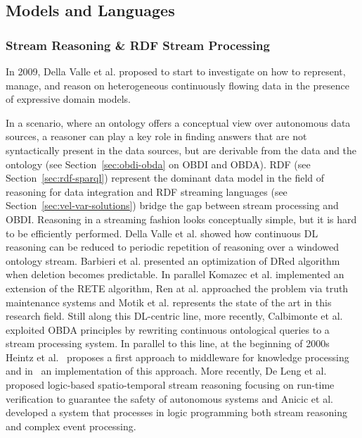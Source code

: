 \subsection{Models and Languages}
\subsubsection{Stream Reasoning \& RDF Stream Processing}\label{sec:sr-rsp}
In 2009, Della Valle et al. \cite{della2009s} proposed to start to investigate on how to represent, manage, and reason on heterogeneous continuously flowing data in the presence of expressive domain models.

In a scenario, where an ontology offers a conceptual view over autonomous data sources, a reasoner can play a key role in finding answers that are not syntactically present in the data sources, but are derivable from the data and the ontology (see Section~\ref{sec:obdi-obda} on OBDI and OBDA).
RDF (see Section~\ref{sec:rdf-sparql}) represent the dominant data model in the field of reasoning for data integration and RDF streaming languages (see Section~\ref{sec:vel-var-solutions}) bridge the gap between stream processing and OBDI. 
Reasoning in a streaming fashion looks conceptually simple, but it is hard to be efficiently performed. Della Valle et al. \cite{DBLP:conf/fis/ValleCBBC08} showed how continuous DL reasoning can be reduced to periodic repetition of reasoning over a windowed ontology stream.
Barbieri et al. \cite{DBLP:conf/esws/BarbieriBCVG10} presented an optimization of DRed algorithm when deletion becomes predictable. In parallel Komazec et al. \cite{DBLP:conf/debs/KomazecCF12} implemented an extension of the RETE algorithm, Ren at al. \cite{DBLP:conf/cikm/RenP11} approached the problem via truth maintenance systems and Motik et al. \cite{DBLP:conf/aaai/MotikNPH15a} represents the state of the art in this research field.
Still along this DL-centric line, more recently, Calbimonte et al. \cite{DBLP:conf/semweb/CalbimonteCG10} exploited OBDA principles by rewriting continuous ontological queries to a stream processing system. In parallel to this line, at the beginning of 2000s Heintz et al.~\cite{DBLP:journals/jifs/HeintzD04} proposes a first approach to middleware for knowledge processing and in~\cite{DBLP:phd/basesearch/Heintz09} an implementation of this approach. More recently, De Leng et al. \cite{DBLP:conf/aaai/LengH16} proposed logic-based spatio-temporal stream reasoning focusing on run-time verification to guarantee the safety of autonomous systems and Anicic et al. \cite{DBLP:journals/semweb/AnicicRFS12} developed a system that processes in logic programming both stream reasoning and complex event processing.

